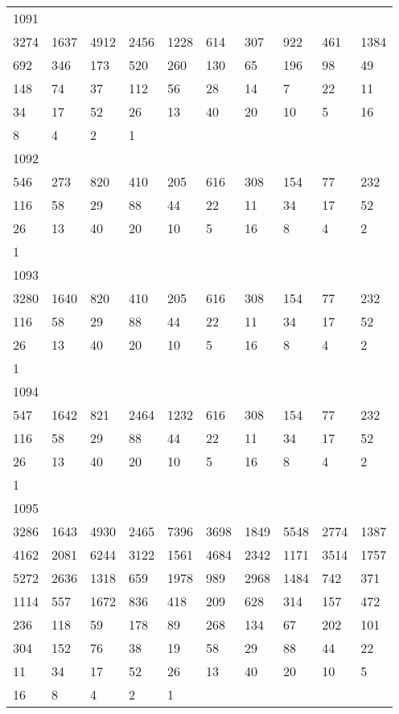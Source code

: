 \begin{longtable}{*{10}{l}}
1091&&&&&&&&&\\
3274& 1637& 4912& 2456& 1228& 614& 307& 922& 461& 1384\\
692& 346& 173& 520& 260& 130& 65& 196& 98& 49\\
148& 74& 37& 112& 56& 28& 14& 7& 22& 11\\
34& 17& 52& 26& 13& 40& 20& 10& 5& 16\\
8& 4& 2& 1& \\

1092&&&&&&&&&\\
546& 273& 820& 410& 205& 616& 308& 154& 77& 232\\
116& 58& 29& 88& 44& 22& 11& 34& 17& 52\\
26& 13& 40& 20& 10& 5& 16& 8& 4& 2\\
1& \\

1093&&&&&&&&&\\
3280& 1640& 820& 410& 205& 616& 308& 154& 77& 232\\
116& 58& 29& 88& 44& 22& 11& 34& 17& 52\\
26& 13& 40& 20& 10& 5& 16& 8& 4& 2\\
1& \\

1094&&&&&&&&&\\
547& 1642& 821& 2464& 1232& 616& 308& 154& 77& 232\\
116& 58& 29& 88& 44& 22& 11& 34& 17& 52\\
26& 13& 40& 20& 10& 5& 16& 8& 4& 2\\
1& \\

1095&&&&&&&&&\\
3286& 1643& 4930& 2465& 7396& 3698& 1849& 5548& 2774& 1387\\
4162& 2081& 6244& 3122& 1561& 4684& 2342& 1171& 3514& 1757\\
5272& 2636& 1318& 659& 1978& 989& 2968& 1484& 742& 371\\
1114& 557& 1672& 836& 418& 209& 628& 314& 157& 472\\
236& 118& 59& 178& 89& 268& 134& 67& 202& 101\\
304& 152& 76& 38& 19& 58& 29& 88& 44& 22\\
11& 34& 17& 52& 26& 13& 40& 20& 10& 5\\
16& 8& 4& 2& 1& \\


\end{longtable}
